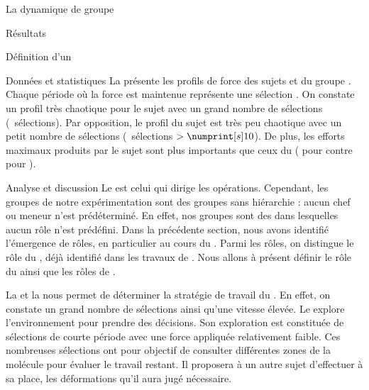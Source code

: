 \documentclass[myfrancais,ngerman,english,frenchb]{mythesis}
\begin{document}
\begin{mychapter}{La dynamique de groupe}
\begin{mysection}{Résultats}
\begin{mysubsection}{Définition d'un }
\begin{mysubsubsection}{Données et statistiques}
					La  présente les profils de force  des sujets  et  du groupe .
					Chaque période où la force est maintenue représente une sélection .
					On constate un profil très chaotique pour le sujet  avec un grand nombre de sélections (~sélections).
					Par opposition, le profil du sujet  est très peu chaotique avec un petit nombre de sélections (~sélections $> \mynum[s]{10}$).
					De plus, les efforts maximaux produits par le sujet  sont plus importants que ceux du  ( pour  contre  pour ).
				\end{mysubsubsection}
				\begin{mysubsubsection}{Analyse et discussion}
					Le  est celui qui dirige les opérations.
					Cependant, les groupes de notre expérimentation sont des groupes sans hiérarchie : aucun chef ou meneur n'est prédéterminé.
					En effet, nos groupes sont des  dans lesquelles aucun rôle n'est prédéfini.
					Dans la précédente section, nous avons identifié l'émergence de rôles, en particulier au cours du \mybrainstorming.
					Parmi les rôles, on distingue le rôle du , déjà identifié dans les travaux de .
					Nous allons à présent définir le rôle du  ainsi que les rôles de .

					La  et la  nous permet de déterminer la stratégie de travail du .
					En effet, on constate un grand nombre de sélections ainsi qu'une vitesse élevée.
					Le  explore l'environnement pour prendre des décisions.
					Son exploration est constituée de sélections de courte période avec une force appliquée relativement faible.
					Ces nombreuses sélections ont pour objectif de consulter différentes zones de la molécule pour évaluer le travail restant.
					Il proposera à un autre sujet d'effectuer à sa place, les déformations qu'il aura jugé nécessaire.


\end{mysubsubsection}
\end{mysubsection}
\end{mysection}
\end{mychapter}
\end{document}
